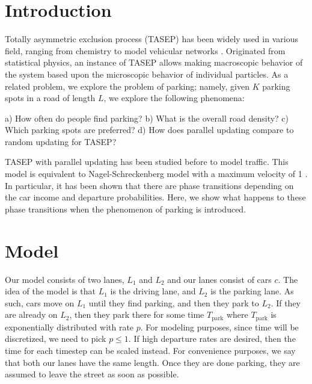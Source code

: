 \documentclass[]{article}
\title{}
\author{}
\begin{document}
\maketitle

\begin{abstract}

\end{abstract}

\section*{Introduction}

\begin{comment}
"What was I studying? Why was it an important question? What did we know about it before I did this study? How will this study advance our knowledge?"
\end{comment}

Totally asymmetric exclusion process (TASEP) has been widely used in various field, ranging from chemistry \cite{chemCoupled} to model vehicular networks \cite{statPhys}. Originated from statistical physics, an instance of TASEP allows making macroscopic behavior of the system based upon the microscopic behavior of individual particles. As a related problem, we explore the problem of parking; namely, given $K$ parking spots in a road of length $L$, we explore the following phenomena:

a) How often do people find parking?
b) What is the overall road density?
c) Which parking spots are preferred? 
d) How does parallel updating compare to random updating for TASEP?

TASEP with parallel updating has been studied before \cite{parallelTASEP} to model traffic. This model is equivalent to Nagel-Schreckenberg model with a maximum velocity of 1 \cite{statPhys}. In particular, it has been shown that there are phase transitions depending on the car income and departure probabilities. Here, we show what happens to these phase transitions when the phenomenon of parking is introduced. 

\section*{Model}

Our model consists of two lanes, $L_1$ and $L_2$ and our lanes consist of cars $c$. The idea of the model is that $L_1$ is the driving lane, and $L_2$ is the parking lane. As such, cars move on $L_1$ until they find parking, and then they park to $L_2$. If they are already on $L_2$, then they park there for some time $T_{\text{park}}$ where $T_{\text{park}}$ is exponentially distributed with rate $p$. For modeling purposes, since time will be discretized, we need to pick $p \leq 1$. If high departure rates are desired, then the time for each timestep can be scaled instead. For convenience purposes, we say that both our lanes have the same length. Once they are done parking, they are assumed to leave the street as soon as possible.
\end{document}
